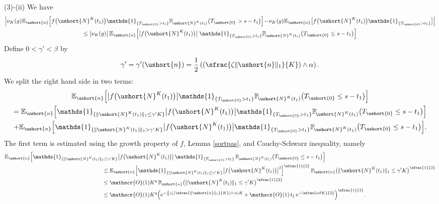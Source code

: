 \documentclass[JEP,XML,SOM,Unicode]{cedram}
\newcommand{\Psfrac}[2]{(\sfrac{#1}{#2})}
\let\mathcal\mathscr
\numberwithin{equation}{section}
\theoremstyle{plain}
\theoremstyle{definition}
\newcommand{\proba}{{\mathbb{P}}}
\newcommand{\E}{{\mathbb{E}}}
\newcommand{\Oun}{\mathcal{O}(1)}
\newcommand{\un}{\mathds{1}}
\newcommand{\vecn}{\ushort{n}}
\newcommand{\veczer}{\ushort{0}}
\newcommand{\leproc}{\ushort{N}^{K}}
\newcommand{\sleproc}{\ushort{N}^{K}}
\newcommand{\nuk}{\nu_{K}}\let\snuk\nuk
\newcommand{\e}{\operatorname{e}}
\newcommand{\norm}[1]{\|#1\|_{1}}\let\snorm\norm
\begin{document}
(3)-(ii) We have
\begin{multline*}
\Bigl|\nuk(g) \E_{\vecn}\Bigl[
f\bigl(\leproc(t_{1})\bigr)\un_{\{T_{\veczer}>t_{1}\}}
\proba_{\!\sleproc(t_{1})}\bigl(T_{\veczer}>s-t_{1}\bigr)\Bigr]\!-\!\nuk(g) \E_{\vecn}\bigl[f\bigl(\leproc(t_{1})\bigr)\un_{\{T_{\veczer}>t_{1}\}}\bigr]\Bigr|\\
\le \big|\nuk(g)\big|\, \E_{\vecn}\Bigl[
\big|f\bigl(\leproc(t_{1})\bigr)\big|\;\un_{\{T_{\veczer}>t_{1}\}}
\proba_{\!\sleproc(t_{1})}\bigl(T_{\veczer}\le s-t_{1}\bigr)\Bigr]
\end{multline*}
Define $0<\gamma'<\beta$ by
\[
\gamma'=\gamma'(\vecn)=\frac{1}{2} \left(\Psfrac{\zeta \norm{\vecn}}{K} \wedge \alpha\right).
\]
We split the right hand side in two terms:
\begin{multline*}
\E_{\vecn}\Bigl[
\big|f\bigl(\leproc(t_{1})\bigr)\big|\un_{\{T_{\veczer}>t_{1}\}}
\proba_{\!\sleproc(t_{1})}\bigl(T_{\veczer}\le s-t_{1}\bigr)\Bigr]\\
=\E_{\vecn}\Bigl[\un_{\{\|\sleproc(t_{1})\|_1\le \gamma' K\}}
\big|f\bigl(\leproc(t_{1})\bigr)\big|\un_{\{T_{\veczer}>t_{1}\}}
\proba_{\!\sleproc(t_{1})}\bigl(T_{\veczer}\le s-t_{1}\bigr)\Bigr] \\
+\E_{\vecn}\Bigl[\un_{\{\|\sleproc(t_{1})\|_1> \gamma' K\}}
\big|f\bigl(\leproc(t_{1})\bigr)\big|\un_{\{T_{\veczer}>t_{1}\}}
\proba_{\!\sleproc(t_{1})}\bigl(T_{\veczer}\le s-t_{1}\bigr)\Bigr].
\end{multline*}
The first term is estimated using the growth property of $f$, Lemma \ref{sortpas},
and Cauchy-Schwarz inequality, namely
\begin{align*}
\E_{\vecn}\Bigl[\un_{\{\|\sleproc(t_{1})\|_1\le \gamma' K\}}&\big|f\bigl(\leproc(t_{1})\bigr)\big|\,
\un_{\{T_{\veczer}>t_{1}\}}\,\proba_{\!\sleproc(t_{1})}\bigl(T_{\veczer}\le s-t_{1}\bigr)\Bigr]\\
& \hspace*{-1cm}\le \E_{\vecn}\Bigl[\un_{\{\|\sleproc(t_{1})\|_1\le \gamma' K\}}
\big|f\bigl(\leproc(t_{1})\bigr)\big|^2\Bigr]^{\sfrac{1}{2}}\,\proba_{\!\vecn}\bigl(\|\leproc(t_{1})\|_1\le \gamma'K\bigr)^{\sfrac{1}{2}}\\
& \hspace*{-1cm}\le \Oun K^{q}\,\proba_{\!\vecn}\bigl(\|\leproc(t_{1})\|_1\le\gamma'K\bigr)^{\sfrac{1}{2}} \\
& \hspace*{-1cm}\le \Oun K^{q}\Bigl(\e^{-\frac{\delta}{2}\left(\zeta\Psfrac{\|\vecn\|_{1}}{K}\wedge\,\alpha\right)K}
+\,\Oun\, t_1 \e^{-\sfrac{\alpha\delta K}{2}} \Bigr)^{\sfrac{1}{2}}.
\end{align*}
\end{document}
